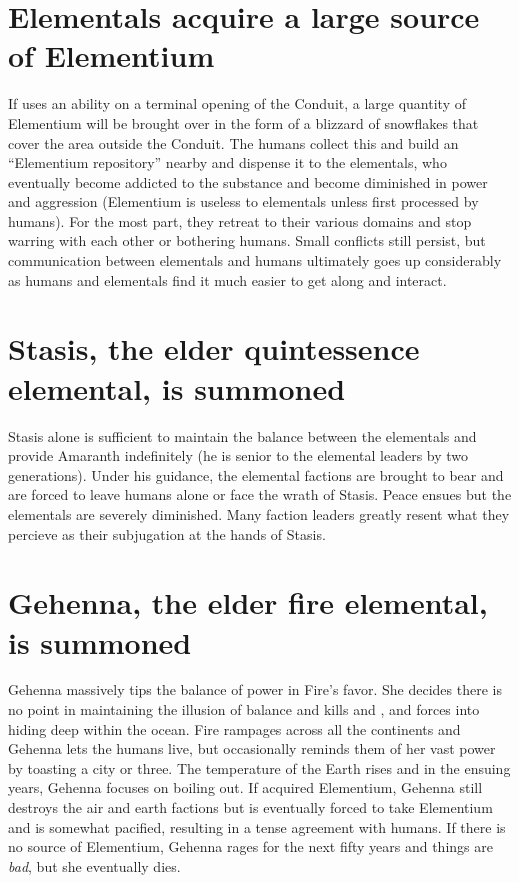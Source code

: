\documentclass[green]{elementals}
\begin{document}
\section{Elementals acquire a large source of Elementium}

If \cScientist{\intro} uses an ability on a terminal opening of the Conduit, a large quantity of Elementium will be brought over in the form of a blizzard of snowflakes that cover the area outside the Conduit. The humans collect this and build an ``Elementium repository'' nearby and dispense it to the elementals, who eventually become addicted to the substance and become diminished in power and aggression (Elementium is useless to elementals unless first processed by humans). For the most part, they retreat to their various domains and stop warring with each other or bothering humans. Small conflicts still persist, but communication between elementals and humans ultimately goes up considerably as humans and elementals find it much easier to get along and interact.

\section{Stasis, the elder quintessence elemental, is summoned}

Stasis alone is sufficient to maintain the balance between the elementals and provide Amaranth indefinitely (he is senior to the elemental leaders by two generations). Under his guidance, the elemental factions are brought to bear and are forced to leave humans alone or face the wrath of Stasis. Peace ensues but the elementals are severely diminished. Many faction leaders greatly resent what they percieve as their subjugation at the hands of Stasis.

\section{Gehenna, the elder fire elemental, is summoned}

Gehenna massively tips the balance of power in Fire's favor. She decides there is no point in maintaining the illusion of balance and kills \cKing{} and \cEarthKing{}, and forces \cWaterQueen{} into hiding deep within the ocean. Fire rampages across all the continents and Gehenna lets the humans live, but occasionally reminds them of her vast power by toasting a city or three. The temperature of the Earth rises and in the ensuing years, Gehenna focuses on boiling \cWaterQueen{} out. If \cScientist{} acquired Elementium, Gehenna still destroys the air and earth factions but is eventually forced to take Elementium and is somewhat pacified, resulting in a tense agreement with humans. If there is no source of Elementium, Gehenna rages for the next fifty years and things are \emph{bad}, but she eventually dies.
\end{document}

